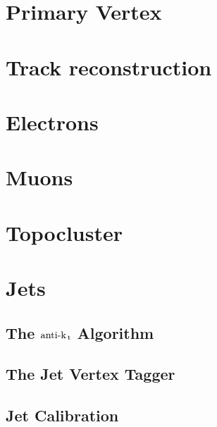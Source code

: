 \documentclass[10pt,twoside,cucitura,classica,english,openany]{toptesi}
\begin{document}
\section{Primary Vertex}
\label{sec:primary-vertex}



\section{Track reconstruction}
\label{sec:track-reconstruction}



\section{Electrons}
\label{sec:electrons}



\section{Muons}
\label{sec:muons}



\section{Topocluster}
\label{sec:topocluster}



\section{Jets}
\label{sec:jets}



\subsection{The \emph{$\text{anti-k}_\mathrm{\, t}$} Algorithm}
\label{sec:anti-k_t}



\subsection{The Jet Vertex Tagger }
\label{sec:jet-vertex-tagger}



\subsection{Jet Calibration}
\label{sec:jet-calibration}
\end{document}
